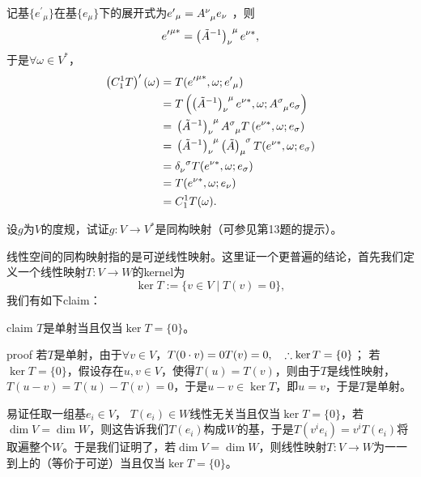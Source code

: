 \begin{xiti}
    \begin{zm}
    	记基$ \{{e^\prime}_\mu \} $在基$\{e_\mu \}$下的展开式为${e^\prime}_\mu = \tensor{A}{^{\nu}_{\mu}}e_\nu $ ，则$${e^\prime}^{\mu*}=\tensor{\left(\tilde{A}^{-1} \right)}{_{\nu}^{\mu} } e^{\nu *} ,$$于是$\forall \omega\in V^* $，
    	\begin{align*}
    	\left(C_1^1 T\right)^\prime (\omega)=&\;  T({e^\prime}^{\mu*},\omega;{e^\prime}_\mu)\\
    	=&\; T\left(\tensor{\left(\tilde{A}^{-1} \right)}{_{\nu}^{\mu} } e^{\nu*},\omega;\tensor{A}{ ^{\sigma}_{\mu} } e_{\sigma} \right)\\
    	=&\;\tensor{\left(\tilde{A}^{-1} \right)}{_{\nu}^{\mu} } \tensor{A}{^{\sigma}_{\mu}} T\left( e^{\nu*},\omega;e_\sigma \right)\\
    	=&\;\tensor{\left(\tilde{A}^{-1} \right)}{_{\nu}^{\mu} } \tensor{\left( \tilde{A} \right)}{ _{\mu}^{\sigma} } T(e^{\nu*},\omega;e_\sigma)\\
    	=&\; \tensor{\delta}{_{\nu}^{\sigma}} T(e^{\nu*},\omega;e_\sigma)\\
    	=&\; T(e^{\nu*},\omega;e_\nu)\\
    	=&\; C_1^1 T(\omega).
    	\end{align*}
    \end{zm}

    \item 设$g$为$V$的度规，试证$ g\colon V\rightarrow V^* $是同构映射（可参见第13题的提示）。
    
    \begin{zm}
    	线性空间的同构映射指的是可逆线性映射。这里证一个更普遍的结论，首先我们定义一个线性映射$T\colon V\rightarrow W $的kernel为$$ \ker T:=\{ v\in V\mid T(v)=0 \}, $$我们有如下claim：
    	\begin{yl}{claim}
    		$T$是单射当且仅当$\ker T=\{0\}$。
    	\end{yl}
        \begin{yl}{proof}
        	若$T$是单射，由于$\forall v\in V$，$T(0\cdot v)=0T(v)=0\qc \therefore \ker T=\{0\} $；
        	若$\ker T=\{0\}$，假设存在$u,v\in V$，使得$T(u)=T(v)$，则由于$T$是线性映射，$T(u-v)=T(u)-T(v)=0$，于是$u-v \in \ker T $，即$u=v $，于是$T$是单射。
        \end{yl}
        易证任取一组基$e_i\in V $， $T(e_i)\in W$线性无关当且仅当$\ker T=\{0\} $，若$\dim V=\dim W $，则这告诉我们$T(e_i) $构成$W$的基，于是$T(v^i e_i)=v^i T(e_i)$将取遍整个$W$。于是我们证明了，若$\dim V=\dim W$，则线性映射$T\colon V\rightarrow W$为一一到上的（等价于可逆）当且仅当$\ker T=\{0\}$。
        

\end{zm}
\end{xiti}
